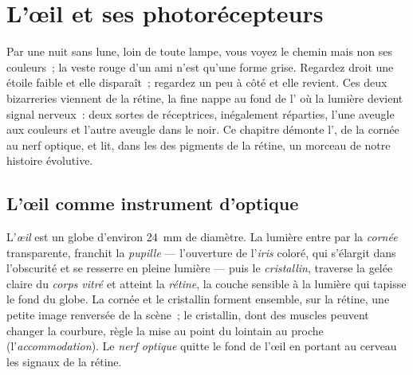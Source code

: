 \chapter{L'œil et ses photorécepteurs}\label{ch:g11:the-eye}

Par une nuit sans lune, loin de toute lampe, vous voyez le chemin mais
non ses couleurs~; la veste rouge d'un ami n'est qu'une forme grise.
Regardez droit une étoile faible et elle disparaît~; regardez un peu à
côté et elle revient. Ces deux bizarreries viennent de la rétine, la
fine nappe au fond de l' où la lumière devient signal nerveux~: deux
sortes de  réceptrices, inégalement réparties, l'une aveugle
aux couleurs et l'autre aveugle dans le noir. Ce chapitre démonte
l', de la cornée au nerf optique, et lit, dans les  des
pigments de la rétine, un morceau de notre histoire évolutive.

\section{L'œil comme instrument d'optique}

\begin{definition}\label{def:g11:the-eye:parts}
L'\emph{œil} est un globe d'environ \qty{24}{mm} de
diamètre. La lumière entre par la \emph{cornée} transparente, franchit
la \emph{pupille} --- l'ouverture de l'\emph{iris} coloré, qui
s'élargit dans l'obscurité et se resserre en pleine lumière --- puis le
\emph{cristallin}, traverse la gelée claire du \emph{corps vitré} et
atteint la \emph{rétine}, la couche sensible à la lumière qui tapisse
le fond du globe. La cornée et le cristallin forment ensemble, sur la
rétine, une petite image renversée de la scène~; le cristallin, dont
des muscles peuvent changer la courbure, règle la mise au point du
lointain au proche (l'\emph{accommodation}). Le \emph{nerf optique}
quitte le fond de l'œil en portant au cerveau les signaux de la rétine.
\end{definition}

